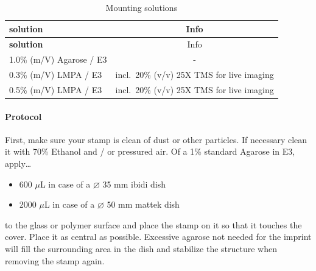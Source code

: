\documentclass[11pt,singlespacinge,twoside]{reedthesis} %
\providecommand{\tightlist}{%
  \setlength{\itemsep}{0pt}\setlength{\parskip}{0pt}}
\begin{document}
\begin{longtable}[]{@{}lc@{}}
\caption{\label{tab:mountsol} Mounting solutions}\tabularnewline
\toprule
\begin{minipage}[b]{0.39\columnwidth}\raggedright
\textbf{solution}\strut
\end{minipage} & \begin{minipage}[b]{0.55\columnwidth}\centering
Info\strut
\end{minipage}\tabularnewline
\midrule
\endfirsthead
\toprule
\begin{minipage}[b]{0.39\columnwidth}\raggedright
\textbf{solution}\strut
\end{minipage} & \begin{minipage}[b]{0.55\columnwidth}\centering
Info\strut
\end{minipage}\tabularnewline
\midrule
\endhead
\begin{minipage}[t]{0.39\columnwidth}\raggedright
1.0\% (m/V) Agarose / E3\strut
\end{minipage} & \begin{minipage}[t]{0.55\columnwidth}\centering
-\strut
\end{minipage}\tabularnewline
\begin{minipage}[t]{0.39\columnwidth}\raggedright
0.3\% (m/V) LMPA / E3\strut
\end{minipage} & \begin{minipage}[t]{0.55\columnwidth}\centering
incl.~20\% (v/v) 25X TMS for live imaging\strut
\end{minipage}\tabularnewline
\begin{minipage}[t]{0.39\columnwidth}\raggedright
0.5\% (m/V) LMPA / E3\strut
\end{minipage} & \begin{minipage}[t]{0.55\columnwidth}\centering
incl.~20\% (v/v) 25X TMS for live imaging\strut
\end{minipage}\tabularnewline
\bottomrule
\end{longtable}
\hypertarget{protocol}{%
\paragraph{Protocol}\label{protocol}}

First, make sure your stamp is clean of dust or other particles. If necessary clean it with 70\% Ethanol and / or pressured air. Of a 1\% standard Agarose in E3, apply\ldots{}
\begin{itemize}
\tightlist
\item
  600 \(\mu\)L in case of a \(\varnothing\) 35 mm ibidi dish
\item
  2000 \(\mu\)L in case of a \(\varnothing\) 50 mm mattek dish
\end{itemize}
to the glass or polymer surface and place the stamp on it so that it touches the cover. Place it as central as possible. Excessive agarose not needed for the imprint will fill the surrounding area in the dish and stabilize the structure when removing the stamp again.
\end{document}
